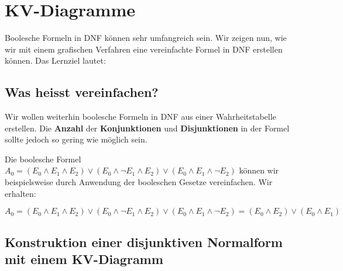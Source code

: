 
\toggletrue{image}
\toggletrue{imagehover}

\chapter{\acs{KV}-Diagramme}
\label{ch:kv-diagramme}

Boolesche Formeln in \ac{DNF} können sehr umfangreich sein. Wir zeigen nun, wie wir mit einem grafischen Verfahren eine vereinfachte Formel in \ac{DNF} erstellen können. Das Lernziel lautet:\\


\section{Was heisst vereinfachen?}

Wir wollen weiterhin boolesche Formeln in \acs{DNF} aus einer Wahrheitstabelle erstellen. Die \textbf{Anzahl} der \textbf{Konjunktionen} und \textbf{Disjunktionen} in der Formel sollte jedoch so gering wie möglich sein.
\begin{example}
Die boolesche Formel $A_0 = (E_0 \wedge E_1 \wedge E_2) \vee (E_0 \wedge \neg E_1 \wedge E_2) \vee (E_0 \wedge E_1 \wedge \neg E_2)$ können wir beispielsweise durch Anwendung der booleschen Gesetze vereinfachen. Wir erhalten:
\begin{center}
$A_0 = (E_0 \wedge E_1 \wedge E_2) \vee (E_0 \wedge \neg E_1 \wedge E_2) \vee (E_0 \wedge E_1 \wedge \neg E_2) = (E_0 \wedge E_2) \vee (E_0 \wedge E_1)$
\end{center}
\end{example}

\section{Konstruktion einer disjunktiven Normalform mit einem \acs{KV}-Diagramm}

